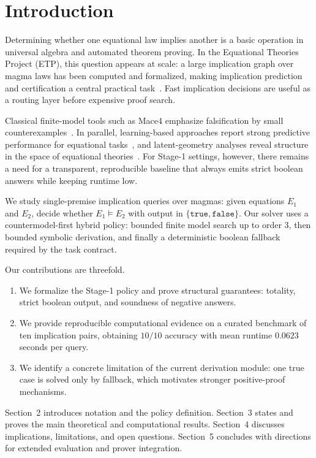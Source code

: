 \section{Introduction}

Determining whether one equational law implies another is a basic operation in universal algebra and automated theorem proving. In the Equational Theories Project (ETP), this question appears at scale: a large implication graph over magma laws has been computed and formalized, making implication prediction and certification a central practical task~\cite{bolan2025etp}. Fast implication decisions are useful as a routing layer before expensive proof search.

Classical finite-model tools such as Mace4 emphasize falsification by small counterexamples~\cite{mccune2003mace4}. In parallel, learning-based approaches report strong predictive performance for equational tasks~\cite{piepenbrock2021learning,axelrod2026twitch}, and latent-geometry analyses reveal structure in the space of equational theories~\cite{berlioz2026latent}. For Stage-1 settings, however, there remains a need for a transparent, reproducible baseline that always emits strict boolean answers while keeping runtime low.

We study single-premise implication queries over magmas: given equations $E_1$ and $E_2$, decide whether $E_1 \models E_2$ with output in $\{\texttt{true},\texttt{false}\}$. Our solver uses a countermodel-first hybrid policy: bounded finite model search up to order $3$, then bounded symbolic derivation, and finally a deterministic boolean fallback required by the task contract.

Our contributions are threefold.
\begin{enumerate}[leftmargin=*]
\item We formalize the Stage-1 policy and prove structural guarantees: totality, strict boolean output, and soundness of negative answers.
\item We provide reproducible computational evidence on a curated benchmark of ten implication pairs, obtaining $10/10$ accuracy with mean runtime $0.0623$ seconds per query.
\item We identify a concrete limitation of the current derivation module: one true case is solved only by fallback, which motivates stronger positive-proof mechanisms.
\end{enumerate}

Section~2 introduces notation and the policy definition. Section~3 states and proves the main theoretical and computational results. Section~4 discusses implications, limitations, and open questions. Section~5 concludes with directions for extended evaluation and prover integration.
